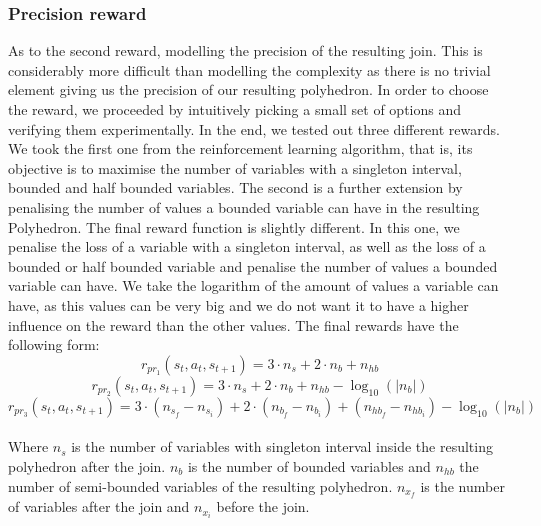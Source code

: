 \subsubsection{Precision reward}
As to the second reward, modelling the precision of the resulting join. This is considerably more difficult than modelling the complexity as there is no trivial element giving us the precision of our resulting polyhedron. In order to choose the reward, we proceeded by intuitively picking a small set of options and verifying them experimentally. In the end, we tested out three different rewards.\\
We took the first one from the reinforcement learning algorithm, that is, its objective is to maximise the number of variables with a singleton interval, bounded and half bounded variables. The second is a further extension by penalising the number of values a bounded variable can have in the resulting Polyhedron. The final reward function is slightly different. In this one, we penalise the loss of a variable with a singleton interval, as well as the loss of a bounded or half bounded variable and penalise the number of values a bounded variable can have. We take the logarithm of the amount of values a variable can have, as this values can be very big and we do not want it to have a higher influence on the reward than the other values. The final rewards have the following form:
\begin{equation}
		r_{pr_1}(s_t,a_t,s_{t+1}) = 3  \cdot n_s + 2 \cdot n_b + n_{hb}
\end{equation}
\begin{equation}
		r_{pr_2}(s_t,a_t,s_{t+1}) = 3  \cdot n_s + 2 \cdot n_b + n_{hb} - \log_{10}(|n_b|)
\end{equation}
\begin{equation}
		r_{pr_3}(s_t,a_t,s_{t+1}) = 3  \cdot (n_{s_f} - n_{s_i}) + 2 \cdot (n_{b_f} - n_{b_i}) + (n_{hb_f} - n_{hb_i}) - \log_{10}(|n_b|)
\end{equation}\mbox{}\\
Where $n_s$ is the number of variables with singleton interval inside the resulting polyhedron after the join. $n_b$ is the number of bounded variables and $n_{hb}$ the number of semi-bounded variables of the resulting polyhedron. $n_{x_f}$ is the number of variables after the join and $n_{x_i}$ before the join.

